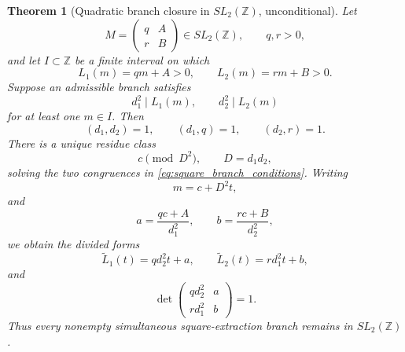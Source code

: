 \documentclass[11pt]{amsart}
\numberwithin{equation}{section}
\theoremstyle{plain}
\newtheorem{theorem}{Theorem}[section]
\theoremstyle{definition}
\theoremstyle{remark}
\newcommand{\Z}{\mathbb Z}
\begin{document}
\begin{theorem}[Quadratic branch closure in $SL_2(\Z)$, unconditional]
\label{thm:SL2_square_closure}
Let
\begin{equation}
M=\begin{pmatrix}q&A\\r&B\end{pmatrix}\in SL_2(\Z),
\qquad q,r>0,
\label{eq:M_SL2}
\end{equation}
and let $I\subset\Z$ be a finite interval on which
\begin{equation}
L_1(m)=qm+A>0,
\qquad
L_2(m)=rm+B>0.
\label{eq:positive_forms}
\end{equation}
Suppose an admissible branch satisfies
\begin{equation}
d_1^2\mid L_1(m),
\qquad
d_2^2\mid L_2(m)
\label{eq:square_branch_conditions}
\end{equation}
for at least one $m\in I$.  Then
\begin{equation}
(d_1,d_2)=1,
\qquad
(d_1,q)=1,
\qquad
(d_2,r)=1.
\label{eq:branch_coprimalities}
\end{equation}
There is a unique residue class
\begin{equation}
c\pmod{D^2},
\qquad D=d_1d_2,
\label{eq:CRT_class}
\end{equation}
solving the two congruences in \eqref{eq:square_branch_conditions}.  Writing
\begin{equation}
m=c+D^2t,
\label{eq:branch_parameterization}
\end{equation}
and
\begin{equation}
a=\frac{qc+A}{d_1^2},
\qquad
b=\frac{rc+B}{d_2^2},
\label{eq:a_b_branch}
\end{equation}
we obtain the divided forms
\begin{equation}
\widetilde L_1(t)=qd_2^2t+a,
\qquad
\widetilde L_2(t)=rd_1^2t+b,
\label{eq:renormalized_forms}
\end{equation}
and
\begin{equation}
\det\begin{pmatrix}qd_2^2&a\\rd_1^2&b\end{pmatrix}=1.
\label{eq:renormalized_determinant}
\end{equation}
Thus every nonempty simultaneous square-extraction branch remains in $SL_2(\Z)$.
\end{theorem}
\end{document}
